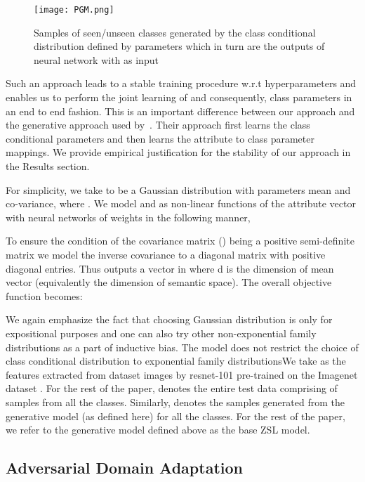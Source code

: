 \documentclass[10pt,twocolumn,letterpaper]{article}
\begin{document}
\begin{figure}[H]
\centering
\begin{minipage}[c]{0.45\textwidth}
\centering
    \texttt{[image: PGM.png]}
    \caption{Samples of seen/unseen classes  generated by the class conditional distribution defined by parameters   which in turn are the outputs of neural network  with  as input}
    \label{fig:PGM}
\end{minipage}
\end{figure}

Such an approach leads to a stable training procedure w.r.t hyperparameters and enables us to perform the joint learning of  and consequently, class parameters  in an end to end fashion. This is an important difference between our approach and the generative approach used by~\cite{verma2017simple}. Their approach first learns the class conditional parameters and then learns the attribute to class parameter mappings. We provide empirical justification for the stability of our approach in the Results section. 


For simplicity, we take  to be a Gaussian distribution with parameters mean and co-variance,  where . 
We model  and  as non-linear functions of the attribute vector  with neural networks of weights  in the following manner,

To ensure the condition of the covariance matrix () being a positive semi-definite matrix we model the inverse covariance to a diagonal matrix with positive diagonal entries. Thus  outputs a vector in  where d is the dimension of mean vector (equivalently the dimension of semantic space). The overall objective function becomes: 


We again emphasize the fact that choosing Gaussian distribution is only for expositional purposes and one can also try other non-exponential family distributions as a part of inductive bias. The model does not restrict the choice of class conditional distribution to exponential family distributionsWe take  as the features extracted from dataset images by resnet-101\cite{resnet} pre-trained on the Imagenet dataset \cite{imagenet2015}.  For the rest of the paper,  denotes the entire test data comprising of samples from all the classes. Similarly,  denotes the samples generated from the generative model (as defined here) for all the classes. For the rest of the paper, we refer to the generative model defined above as the base ZSL model.



\subsection{Adversarial Domain Adaptation}
\label{sec:ADA}
\end{document}

